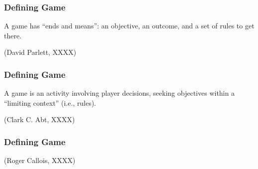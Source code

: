 \begin{frame}
	\frametitle{Defining Game}
		
	\begin{center}
	\begin{huge}
	A game has ``ends and means'': an objective, an outcome, and a set of rules to get there.
	\end{huge}
	
	\vspace{3em}
	
	(David Parlett, XXXX)
	\end{center}

\end{frame}

\begin{frame}
	\frametitle{Defining Game}
		
	\begin{center}
	\begin{huge}
	A game is an activity involving player decisions, seeking objectives within a ``limiting context'' (i.e., rules).
	\end{huge}
	
	\vspace{3em}
	
	(Clark C. Abt, XXXX)
	\end{center}

\end{frame}

\begin{frame}
	\frametitle{Defining Game}
		
	\begin{center}
	
	\vspace{3em}
	
	(Roger Callois, XXXX)
	\end{center}

\end{frame}

